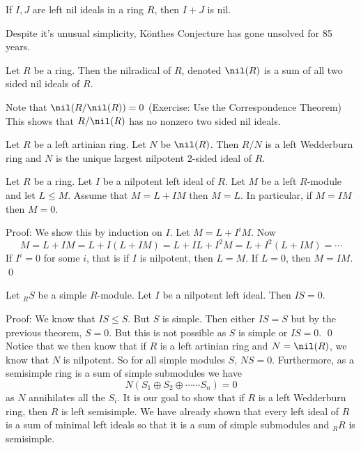 \begin{conject}
If $I,J$ are left nil ideals in a ring $R$, then $I+J$ is nil. 
\end{conject}

Despite it's unusual simplicity, K\"onthes Conjecture has gone unsolved for 85 years.

\begin{dfn}[Nilradical]
Let $R$ be a ring. Then the nilradical of $R$, denoted $\nil(R)$ is a sum of all two sided nil ideals of $R$.
\end{dfn}

Note that $\nil(R/\nil(R))=0$ (Exercise: Use the Correspondence Theorem) This shows that $R/\nil(R)$ has no nonzero two sided nil ideals. 

\begin{thm}
Let $R$ be a left artinian ring. Let $N$ be $\nil(R)$. Then $R/N$ is a left Wedderburn ring and $N$ is the unique largest nilpotent 2-sided ideal of $R$.
\end{thm}

\begin{thm}
Let $R$ be a ring. Let $I$ be a nilpotent left ideal of $R$. Let $M$ be a left $R$-module and let $L \leq M$. Assume that $M=L+IM$ then $M=L$. In particular, if $M=IM$ then $M=0$. 
\end{thm}

Proof: We show this by induction on $I$. Let $M=L+I^iM$. Now
\[
M=L+IM=L+I(L+IM)=L+IL+I^2M=L+I^2(L+IM)=\cdots
\]
If $I^i=0$ for some $i$, that is if $I$ is nilpotent, then $L=M$. If $L=0$, then $M=IM$. \qed \\

\begin{thm}
Let $_R S$ be a simple $R$-module. Let $I$ be a nilpotent left ideal. Then $IS=0$.
\end{thm}

Proof: We know that $IS \leq S$. But $S$ is simple. Then either $IS=S$ but by the previous theorem, $S=0$. But this is not possible as $S$ is simple or $IS=0$. \qed \\

Notice that we then know that if $R$ is a left artinian ring and $N=\nil(R)$, we know that $N$ is nilpotent. So for all simple modules $S$, $NS=0$. Furthermore, as a semisimple ring is a sum of simple submodules we have
\[
N(S_1 \oplus S_2 \oplus \cdots \cdots S_n)=0
\]
as $N$ annihilates all the $S_i$. It is our goal to show that if $R$ is a left Wedderburn ring, then $R$ is left semisimple. We have already shown that every left ideal of $R$ is a sum of minimal left ideals so that it is a sum of simple submodules and $_R R$ is semisimple. 

